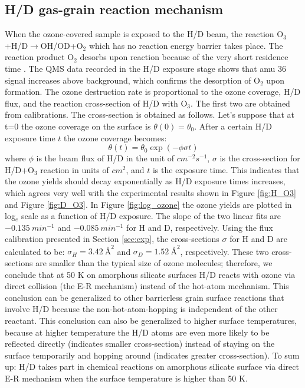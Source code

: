 \documentclass[iop]{emulateapj}
\begin{document}
\subsection{H/D gas-grain reaction mechanism}
When the ozone-covered sample is exposed to the H/D beam, the reaction O$_3$+H/D$\rightarrow$OH/OD+O$_2$ which has no reaction energy barrier \citep{Mokrane2009} takes place. The reaction product O$_2$ desorbs upon reaction because of the very short residence time \citep{Jing2012}. The QMS data recorded in the H/D exposure stage shows that amu 36 signal increases above background, which confirms the desorption of O$_2$ upon formation. The ozone destruction rate is proportional to the ozone coverage, H/D flux, and the reaction cross-section of H/D with O$_3$. The first two are obtained  from calibrations. The cross-section is obtained as follows. Let's suppose that at t=0 the ozone coverage on the surface is $\theta (0)=\theta_0$. After a certain H/D exposure time $t$ the ozone coverage becomes:
\begin{equation}
 \theta (t)=\theta_0 \exp(-\phi \sigma t)
\end{equation}
where $\phi$ is the beam flux of H/D in the unit of $cm^{-2}s^{-1}$, $\sigma$ is the cross-section for  H/D+O$_3$ reaction in units of $cm^{2}$, and $t$ is the exposure time. This indicates that the ozone yields should decay exponentially as H/D exposure times increases, which agrees very well with the experimental results shown in Figure \ref{fig:H_O3} and Figure \ref{fig:D_O3}. In Figure \ref{fig:log_ozone} the ozone yields are plotted in log$_e$ scale as a function of H/D exposure. The slope of the two linear fits are $-0.135\ min^{-1}$ and $-0.085\ min^{-1}$ for H and D, respectively. Using the flux calibration presented in Section \ref{sec:exp}, the cross-sections $\sigma$ for H and D are calculated to be: $\sigma_H=3.42\ \text{\AA}^2$ and $\sigma_D=1.52\ \text{\AA}^2$, respectively. These two cross-sections are smaller than the typical size of ozone molecules; therefore, we conclude that at 50 K on amorphous silicate surfaces H/D reacts with ozone via direct collision (the E-R mechanism) instead of the hot-atom mechanism. This conclusion can be generalized to other barrierless grain surface reactions that involve H/D because the non-hot-atom-hopping is independent of the other reactant.  This conclusion can also be generalized to higher surface temperatures, because at higher temperature the H/D atoms are even more likely to be reflected directly (indicates smaller cross-section) instead of staying on the surface temporarily and hopping around (indicates greater cross-section). To sum up: H/D takes part in chemical reactions on amorphous silicate surface via direct E-R mechanism when the surface temperature is higher than 50 K. 
\end{document}

